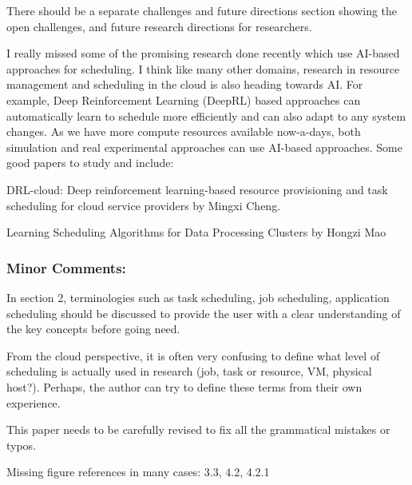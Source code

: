 
There should be a separate challenges and future directions section
showing the open challenges, and future research directions for
researchers.


I really missed some of the promising research done recently which use
AI-based approaches for scheduling. I think like many other domains,
research in resource management and scheduling in the cloud is also
heading towards AI. For example, Deep Reinforcement Learning (DeepRL)
based approaches can automatically learn to schedule more efficiently
and can also adapt to any system changes. As we have more compute
resources available now-a-days, both simulation and real experimental
approaches can use AI-based approaches. Some good papers to study and
include:



DRL-cloud: Deep reinforcement learning-based resource provisioning and
task scheduling for cloud service providers by Mingxi Cheng.


Learning Scheduling Algorithms for Data Processing Clusters by Hongzi Mao



\subsubsection{Minor Comments:}

In section 2, terminologies such as task scheduling, job scheduling,
application scheduling should be discussed to provide the user with a
clear understanding of the key concepts before going need. 


From the
cloud perspective, it is often very confusing to define what level of
scheduling is actually used in research (job, task or resource, VM,
physical host?). Perhaps, the author can try to define these terms
from their own experience.


This paper needs to be carefully revised to fix all the grammatical
mistakes or typos.


Missing figure references in many cases: 3.3, 4.2, 4.2.1




